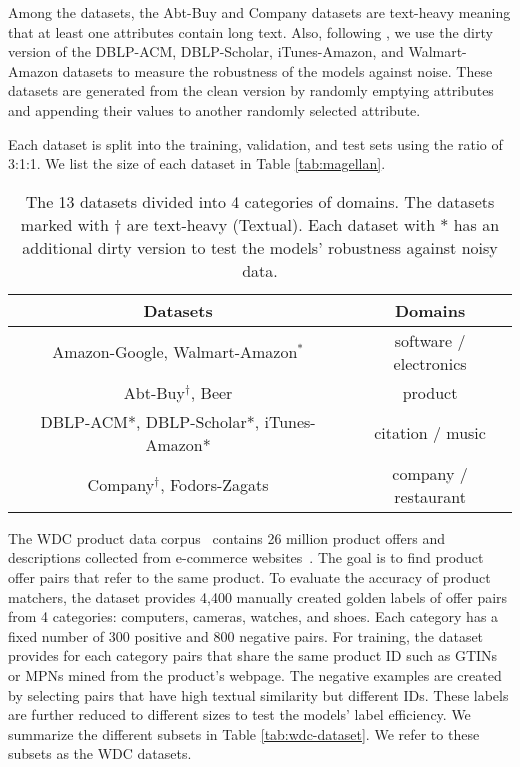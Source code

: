 Among the datasets, the Abt-Buy and Company datasets are text-heavy meaning that
at least one attributes contain long text. 
Also, following \cite{Mudgal:2018:DeepMatcher},
we use the dirty version of the DBLP-ACM, DBLP-Scholar, iTunes-Amazon, and Walmart-Amazon datasets
to measure the robustness of the models against noise. 
These datasets are generated from the clean version by
randomly emptying attributes and appending their values
to another randomly selected attribute.

Each dataset is split into the training, validation, and test sets using the ratio of \textsf{3:1:1}.
We list the size of each dataset in Table \ref{tab:magellan}.

\begin{table}[t]
\small
    \centering
    \caption{\small The 13 datasets divided into 4 categories of domains. 
    The datasets marked with $\dag$ are text-heavy (Textual).
    Each dataset with $*$ has an additional dirty version to test the models' robustness against
    noisy data. }
    \vspace{-3mm}
    \label{tab:magellan-dataset}
\begin{tabular}{cc}
\toprule
\textbf{Datasets}                              & \textbf{Domains}                \\ \midrule
Amazon-Google, Walmart-Amazon$^*$         & software / electronics \\
Abt-Buy$^\dag$, Beer                         & product                \\
DBLP-ACM*, DBLP-Scholar*, iTunes-Amazon* & citation / music       \\
Company$^\dag$, Fodors-Zagats                & company / restaurant   \\ \bottomrule
\end{tabular}
\vspace{-3mm}\end{table}




The WDC product data corpus~\cite{Primpeli:2019:WDC} contains 26 million product offers and descriptions collected from e-commerce 
websites~\cite{wdc}. The goal is to find product offer pairs that refer to the same product.
To evaluate the accuracy of product matchers, the dataset provides 4,400 manually created 
golden labels of offer pairs from 4 categories: computers, cameras, watches, and shoes.
Each category has a fixed number of 300 positive and 800 negative pairs.
For training, the dataset provides for each category 
pairs that share the same product ID such as GTINs or MPNs mined from the product's webpage.
The negative examples are created by selecting pairs that have high textual similarity but different IDs.
These labels are further reduced to different sizes to test the models' label efficiency.
We summarize the different subsets in Table \ref{tab:wdc-dataset}.
We refer to these subsets as the WDC datasets.


